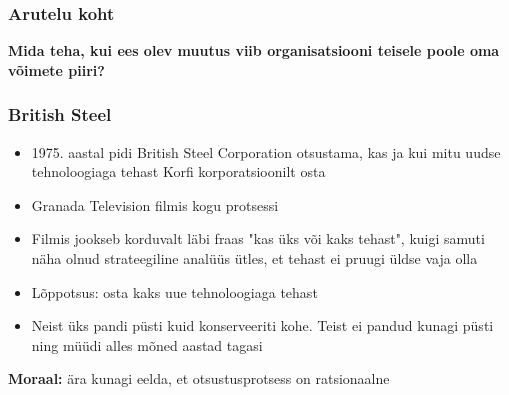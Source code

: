 \begin{frame}[fragile]
  \frametitle{Arutelu koht}
		\begin{center}
			\textbf{Mida teha, kui ees olev muutus viib organisatsiooni teisele poole oma võimete piiri?}
		\end{center}
\end{frame}

\begin{frame}[fragile]
  \frametitle{British Steel}
	\begin{itemize}
		\item 1975. aastal pidi British Steel Corporation otsustama, kas ja kui mitu uudse tehnoloogiaga tehast Korfi korporatsioonilt osta 
		\item Granada Television filmis kogu protsessi
		\item Filmis jookseb korduvalt läbi fraas "kas üks või kaks tehast", kuigi samuti näha olnud strateegiline analüüs ütles, et tehast ei pruugi üldse vaja olla
		\item Lõppotsus: osta kaks uue tehnoloogiaga tehast
		\item Neist üks pandi püsti kuid konserveeriti kohe. Teist ei pandud kunagi püsti ning müüdi alles mõned aastad tagasi
	\end{itemize}
	\begin{center}
		\textbf{Moraal:} ära kunagi eelda, et otsustusprotsess on ratsionaalne
	\end{center}
\end{frame}

